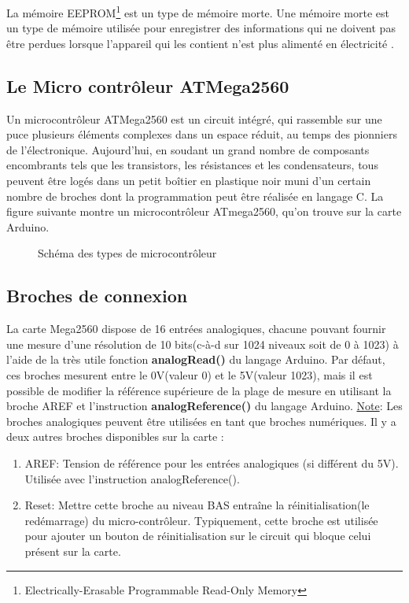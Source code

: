\documentclass[12pt, openany]{report}
\begin{document}
La mémoire EEPROM\footnote{Electrically-Erasable Programmable Read-Only Memory} est un type de mémoire morte. Une mémoire morte est un type de mémoire utilisée pour enregistrer des informations
 qui ne doivent pas être perdues lorsque l'appareil qui les contient n'est plus alimenté en électricité .        		          		
\subsection{ Le Micro contrôleur ATMega2560 }
Un microcontrôleur ATMega2560 est un circuit intégré, qui rassemble sur une puce plusieurs éléments complexes dans un espace réduit, au
temps des pionniers de l'électronique. Aujourd'hui, en soudant un grand nombre de composants encombrants tels que les transistors, les
résistances et les condensateurs, tous peuvent être logés dans un petit boîtier en plastique noir muni d'un certain nombre de broches
dont la programmation peut être réalisée en langage C. La figure suivante montre un microcontrôleur ATmega2560, qu'on trouve sur la carte
 Arduino.
\begin{figure}[!h]
    \centering
  
    \caption{Schéma des types de microcontrôleur} 		
\end{figure}
		
\subsection{Broches de connexion}
La carte Mega2560 dispose de 16 entrées analogiques, chacune pouvant fournir une mesure d'une résolution de 10 bits(c-à-d sur 1024 niveaux
 soit de 0 à 1023) à l'aide de la très utile fonction \textbf{analogRead()} du langage Arduino. Par défaut, ces broches mesurent entre
  le 0V(valeur 0) et le 5V(valeur 1023), mais il est possible de modifier la référence supérieure de la plage de mesure en utilisant la
broche AREF et l'instruction \textbf{analogReference()} du langage Arduino.
\underline{Note}: Les broches analogiques peuvent être utilisées en tant que broches numériques.
Il y a deux autres broches disponibles sur la carte :
\begin{enumerate}
    \item AREF: Tension de référence pour les entrées analogiques (si différent du 5V). Utilisée avec l'instruction analogReference().
    \item Reset: Mettre cette broche au niveau BAS entraîne la réinitialisation(le redémarrage) du micro-contrôleur. Typiquement, cette broche est utilisée pour ajouter un bouton de réinitialisation sur le circuit qui bloque celui présent sur la carte.
         		 \end{enumerate}
         		
\end{document}

